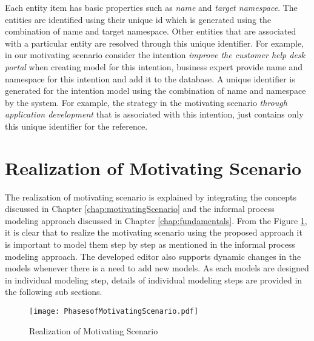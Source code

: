 Each entity item has basic properties such as \textit{name} and \textit{target namespace}. The entities are identified using their unique id which is generated using the combination of name and target namespace. Other entities that are associated with a particular entity are resolved through this unique identifier. For example, in our motivating scenario consider the intention \textit{improve the customer help desk portal} when creating model for this intention, business expert provide name and namespace for this intention and add it to the database. A unique identifier is generated for the intention model using the combination of name and namespace by the system. For example, the strategy in the motivating scenario \textit{through application  development} that is associated with this intention, just contains only this unique identifier for the reference. 

\section{Realization of Motivating Scenario}
\label{sec:realization}
The realization of motivating scenario is explained by integrating the concepts discussed in Chapter \ref{chap:motivatingScenario} and the informal process modeling approach discussed in Chapter \ref{chap:fundamentals}. From the Figure \ref{fig:realizationofmotivatingscenario}, it is clear that to realize the motivating scenario using the proposed approach it is important to model them step by step as mentioned in the informal process modeling approach. The developed editor also supports dynamic changes in the models whenever there is a need to add new models. As each models are designed in individual modeling step, details of individual modeling steps are provided in the following sub sections. 

\begin{figure}
	\centering
	\texttt{[image: PhasesofMotivatingScenario.pdf]}
	\caption{Realization of Motivating Scenario}
	\label{fig:realizationofmotivatingscenario}
\end{figure}

